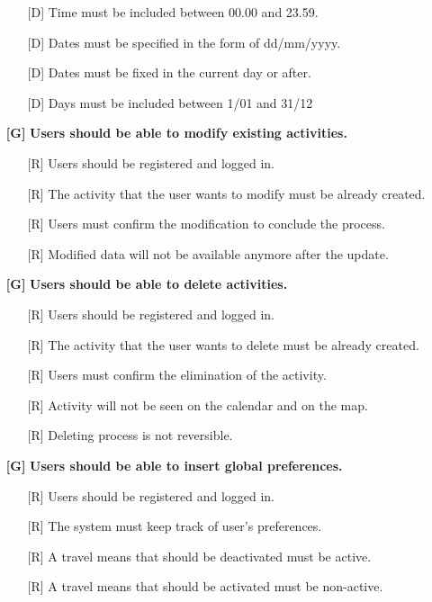 \documentclass[12pt,titlepage]{article}
\begin{document}
\begin{itemize}
\begin{itemize}
\item[{[D\ped{1}]}]  Time must be included between 00.00 and 23.59.
\item[{[D\ped{2}]}]  Dates must be specified in the form of dd/mm/yyyy.
\item[{[D\ped{3}]}]  Dates must be fixed in the current day or after.
\item[{[D\ped{4}]}] Days must be included between 1/01 and 31/12
\end{itemize}
\item[\textbf{ {[G\ped{4}]}}]	\textbf{			Users should be able to modify existing activities.}
\begin{itemize}
\item[{[R\ped{1}]}]  Users should be registered and logged in.
\item[{[R\ped{2}]}] The activity that the user wants to modify must be already created.
\item[{[R\ped{3}]}] Users must confirm the modification to conclude the process.
\item[{[R\ped{4}]}] Modified data will not be available anymore after the update.
\end{itemize}
\item[\textbf{ {[G\ped{5}]}}]	\textbf{		Users should be able to delete activities.}
\begin{itemize}
\item[{[R\ped{1}]}]  Users should be registered and logged in.
\item[{[R\ped{2}]}] The activity that the user wants to delete must be already created.
\item[{[R\ped{3}]}] Users must confirm the elimination of the activity.
\item[{[R\ped{4}]}] Activity will not be seen on the calendar and on the map.
\item[{[R\ped{4}]}] Deleting process is not reversible.
\end{itemize}
\item[\textbf{ {[G\ped{6}]}}]	\textbf{	Users should be able to insert global preferences.}
\begin{itemize}
\item[{[R\ped{1}]}]  Users should be registered and logged in.
\item[{[R\ped{2}]}]  The system must keep track of user's preferences.
\item[{[R\ped{3}]}] A travel means that should be deactivated must be active.
\item[{[R\ped{4}]}] A travel means that should be activated must be non-active.

\end{itemize}
\end{itemize}
\end{document}
